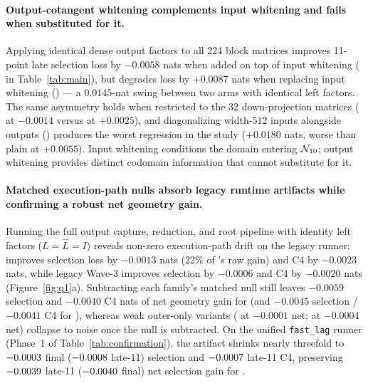 \paragraph{Output-cotangent whitening complements input whitening and fails when substituted for it.}
Applying identical dense output factors to all 224 block matrices improves
11-point late selection loss by $-0.0058$ nats when added on top of input
whitening ( in Table~\ref{tab:main}), but degrades loss by
$+0.0087$ nats when replacing input whitening () --- a
$0.0145$-nat swing between two arms with identical left factors. The same
asymmetry holds when restricted to the 32 down-projection matrices
( at $-0.0014$ versus  at $+0.0025$),
and diagonalizing width-$512$ inputs alongside outputs ()
produces the worst regression in the study ($+0.0180$ nats, worse than plain
 at $+0.0055$). Input whitening conditions the domain entering
$\mathcal{N}_{10}$; output whitening provides distinct codomain information that cannot
substitute for it.

\paragraph{Matched execution-path nulls absorb legacy runtime artifacts while confirming a robust net geometry gain.}
Running the full output capture, reduction, and root pipeline with identity left
factors ($L = \hat L = I$) reveals non-zero execution-path drift on the legacy
runner:  improves selection loss by $-0.0013$ nats ($22\%$ of
's raw gain) and C4 by $-0.0023$ nats, while legacy Wave-3
 improves selection by $-0.0006$ and C4 by $-0.0020$ nats
(Figure~\ref{fig:q1}a). Subtracting each family's matched null still leaves
$-0.0059$ selection and $-0.0040$ C4 nats of net geometry gain for
 (and $-0.0045$ selection / $-0.0041$ C4 for ),
whereas weak outer-only variants ( at $-0.0001$ net;
 at $-0.0004$ net) collapse to noise once the null is
subtracted. On the unified \texttt{fast\_lag} runner (Phase~1 of
Table~\ref{tab:confirmation}), the  artifact shrinks nearly
threefold to $-0.0003{}$ final ($-0.0008{}$
late-11) selection and $-0.0007{}$ late-11 C4, preserving
$-0.0039{}$ late-11 ($-0.0040{}$
final) net selection gain for .

